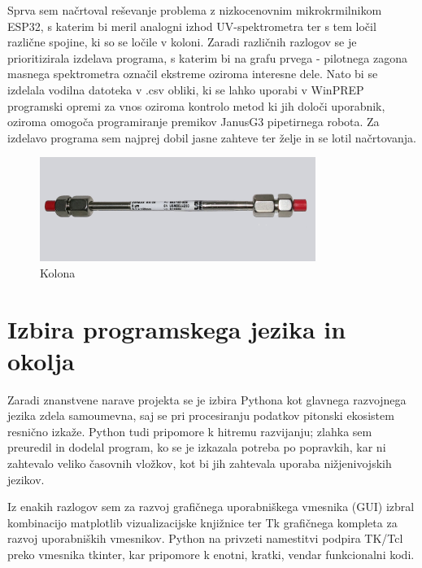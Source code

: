 \documentclass[a4paper,12pt]{article}
\begin{document}
Sprva sem načrtoval reševanje problema z nizkocenovnim mikrokrmilnikom ESP32, s katerim bi meril analogni izhod UV-spektrometra ter s tem ločil različne spojine, ki so se ločile v koloni. Zaradi različnih razlogov se je prioritizirala izdelava programa, s katerim bi na grafu prvega - pilotnega zagona masnega spektrometra označil ekstreme oziroma interesne dele. Nato bi se izdelala vodilna datoteka v .csv obliki, ki se lahko uporabi v WinPREP programski opremi za vnos oziroma kontrolo metod ki jih določi uporabnik, oziroma omogoča programiranje premikov JanusG3 pipetirnega robota. Za izdelavo programa sem najprej dobil jasne zahteve ter želje in se lotil načrtovanja.
\begin {figure}[H]
\centering
\includegraphics[width=0.8\textwidth]{assets/kolona-1.jpg}
   \caption{Kolona}
    \label{fig:kolona-1}
\end{figure}


\newpage
\section{Izbira programskega jezika in okolja}

Zaradi znanstvene narave projekta se je izbira Pythona kot glavnega razvojnega jezika zdela samoumevna, saj se pri procesiranju podatkov pitonski ekosistem resnično izkaže. Python tudi pripomore k hitremu razvijanju; zlahka sem preuredil in dodelal program, ko se je izkazala potreba po popravkih, kar ni zahtevalo veliko časovnih vložkov, kot bi jih zahtevala uporaba nižjenivojskih jezikov.

Iz enakih razlogov sem za razvoj grafičnega uporabniškega vmesnika (GUI) izbral kombinacijo matplotlib\cite{matplotlib} vizualizacijske knjižnice ter Tk grafičnega kompleta za razvoj uporabniških vmesnikov. Python na privzeti namestitvi podpira TK/Tcl preko vmesnika tkinter\cite{tkinter}, kar pripomore k enotni, kratki, vendar funkcionalni kodi.
\end{document}
